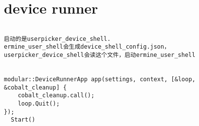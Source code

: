 \section{device runner}

\begin{verbatim}

启动的是userpicker_device_shell.
ermine_user_shell会生成device_shell_config.json，
userpicker_device_shell会读这个文件，启动ermine_user_shell


modular::DeviceRunnerApp app(settings, context, [&loop, &cobalt_cleanup] {
    cobalt_cleanup.call();
    loop.Quit();
});
  Start()




\end{verbatim}
